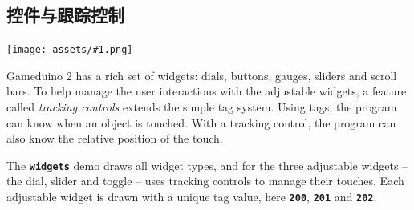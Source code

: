 \documentclass[10pt]{book}
\newcommand{\gdtwo}{Gameduino 2 }
\newcommand{\png}[1]{
\begin{center}
\texttt{[image: assets/\#1.png]}
\end{center}
}
\newcommand{\mach}[1]{\texttt{\textbf{#1}}}
\begin{document}
\begin{CJK}{UTF8}{gkai}
\section{控件与跟踪控制}
\label{widgets}

\png{widgets3d}

\gdtwo has a rich set of widgets: dials, buttons, gauges, sliders and scroll bars.
To help manage the user interactions with the adjustable widgets, a feature called \textit{tracking controls}
extends the simple tag system.
Using tags, the program can know when an object is touched.
With a tracking control, the program can also know the relative position of the touch.

The \mach{widgets} demo draws all widget types, and
for the three adjustable widgets -- the dial, slider and toggle -- uses tracking controls to manage their touches.
Each adjustable widget is drawn with a unique tag value, here
\mach{200},
\mach{201} and
\mach{202}.

\vspace{10pt}

\end{CJK}
\end{document}
